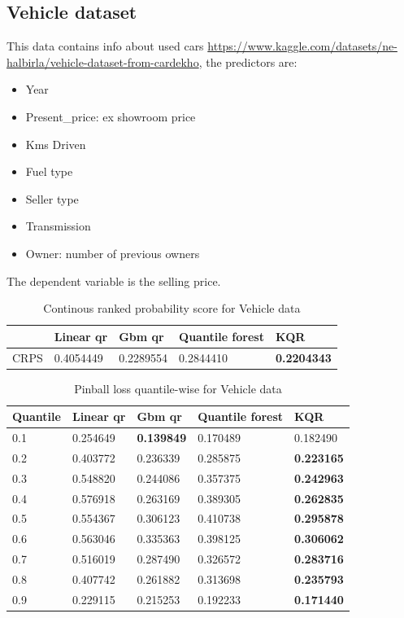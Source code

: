 \subsection{Vehicle dataset}
This data contains info about used cars \href{https://www.kaggle.com/datasets/nehalbirla/vehicle-dataset-from-cardekho}{https://www.kaggle.com/datasets/ne-halbirla/vehicle-dataset-from-cardekho}, the predictors are:
\begin{itemize}
    \item Year
    \item Present\_price: ex showroom price
    \item Kms Driven
    \item Fuel type
    \item Seller type
    \item Transmission
    \item Owner: number of previous owners
\end{itemize}
The dependent variable is the selling price.

\begin{table}
\caption{Continous ranked probability score for Vehicle data}
\begin{tabular}{lllll}
    \toprule
     & Linear qr & Gbm qr & Quantile forest & KQR \\
    \midrule
    CRPS & 0.4054449 & 0.2289554 & 0.2844410 & \textbf{0.2204343} \\
    \bottomrule
    \end{tabular}
\end{table}

\begin{table}
    \caption{Pinball loss quantile-wise for Vehicle data}
    \begin{tabular}{lllll}
    \toprule
    Quantile & Linear qr & Gbm qr & Quantile forest & KQR \\
    \midrule
    0.1 & 0.254649 & \textbf{0.139849} & 0.170489 & 0.182490 \\
    0.2 & 0.403772 & 0.236339 & 0.285875 & \textbf{0.223165} \\
    0.3 & 0.548820 & 0.244086 & 0.357375 & \textbf{0.242963} \\
    0.4 & 0.576918 & 0.263169 & 0.389305 & \textbf{0.262835} \\
    0.5 & 0.554367 & 0.306123 & 0.410738 & \textbf{0.295878} \\
    0.6 & 0.563046 & 0.335363 & 0.398125 & \textbf{0.306062} \\
    0.7 & 0.516019 & 0.287490 & 0.326572 & \textbf{0.283716} \\
    0.8 & 0.407742 & 0.261882 & 0.313698 & \textbf{0.235793} \\
    0.9 & 0.229115 & 0.215253 & 0.192233 & \textbf{0.171440} \\
    \bottomrule
    \end{tabular}
\end{table}

